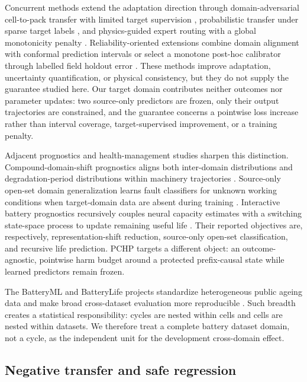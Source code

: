 \documentclass[11pt]{article}
\begin{document}
Concurrent methods extend the adaptation direction through domain-adversarial cell-to-pack transfer with limited target supervision \citep{shu2026celltopack}, probabilistic transfer under sparse target labels \citep{shao2026probabilistic}, and physics-guided expert routing with a global monotonicity penalty \citep{jiang2026phasemoe}. Reliability-oriented extensions combine domain alignment with conformal prediction intervals \citep{filgueira2026conformalized} or select a monotone post-hoc calibrator through labelled field holdout error \citep{nyachionjeka2026safecalibrated}. These methods improve adaptation, uncertainty quantification, or physical consistency, but they do not supply the guarantee studied here. Our target domain contributes neither outcomes nor parameter updates: two source-only predictors are frozen, only their output trajectories are constrained, and the guarantee concerns a pointwise loss increase rather than interval coverage, target-supervised improvement, or a training penalty.

Adjacent prognostics and health-management studies sharpen this distinction. Compound-domain-shift prognostics aligns both inter-domain distributions and degradation-period distributions within machinery trajectories \citep{ding2023compound}. Source-only open-set domain generalization learns fault classifiers for unknown working conditions when target-domain data are absent during training \citep{song2026regroupment}. Interactive battery prognostics recursively couples neural capacity estimates with a switching state-space process to update remaining useful life \citep{duan2025interactive}. Their reported objectives are, respectively, representation-shift reduction, source-only open-set classification, and recursive life prediction. PCHP targets a different object: an outcome-agnostic, pointwise harm budget around a protected prefix-causal state while learned predictors remain frozen.

The BatteryML and BatteryLife projects standardize heterogeneous public ageing data and make broad cross-dataset evaluation more reproducible \citep{zhang2024batteryml,tan2025batterylife}. Such breadth creates a statistical responsibility: cycles are nested within cells and cells are nested within datasets. We therefore treat a complete battery dataset domain, not a cycle, as the independent unit for the development cross-domain effect.

\subsection{Negative transfer and safe regression}
\end{document}
